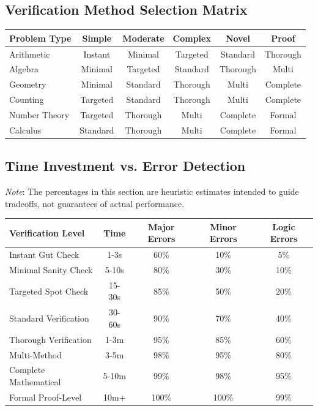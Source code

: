 \documentclass{article}
\begin{document}
\subsection{Verification Method Selection Matrix}

\begin{center}
\begin{tabular}{|l|c|c|c|c|c|}
\hline
\textbf{Problem Type} & \textbf{Simple} & \textbf{Moderate} & \textbf{Complex} & \textbf{Novel} & \textbf{Proof} \\
\hline
Arithmetic & Instant & Minimal & Targeted & Standard & Thorough \\
Algebra & Minimal & Targeted & Standard & Thorough & Multi \\
Geometry & Minimal & Standard & Thorough & Multi & Complete \\
Counting & Targeted & Standard & Thorough & Multi & Complete \\
Number Theory & Targeted & Thorough & Multi & Complete & Formal \\
Calculus & Standard & Thorough & Multi & Complete & Formal \\
\hline
\end{tabular}
\end{center}

\subsection{Time Investment vs. Error Detection}

\noindent\small\textit{Note}: The percentages in this section are heuristic estimates intended to guide tradeoffs, not guarantees of actual performance.

\begin{center}
\begin{tabular}{|l|c|c|c|c|}
\hline
\textbf{Verification Level} & \textbf{Time} & \textbf{Major Errors} & \textbf{Minor Errors} & \textbf{Logic Errors} \\
\hline
Instant Gut Check & 1-3s & 60\% & 10\% & 5\% \\
Minimal Sanity Check & 5-10s & 80\% & 30\% & 10\% \\
Targeted Spot Check & 15-30s & 85\% & 50\% & 20\% \\
Standard Verification & 30-60s & 90\% & 70\% & 40\% \\
Thorough Verification & 1-3m & 95\% & 85\% & 60\% \\
Multi-Method & 3-5m & 98\% & 95\% & 80\% \\
Complete Mathematical & 5-10m & 99\% & 98\% & 95\% \\
Formal Proof-Level & 10m+ & 100\% & 100\% & 99\% \\
\hline
\end{tabular}
\end{center}
\end{document}
